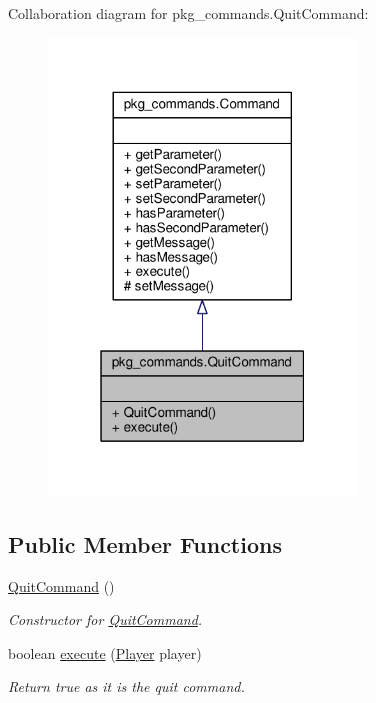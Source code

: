 Collaboration diagram for pkg\-\_\-commands.\-Quit\-Command\-:
\nopagebreak
\begin{figure}[H]
\begin{center}
\leavevmode
\includegraphics[width=232pt]{classpkg__commands_1_1QuitCommand__coll__graph}
\end{center}
\end{figure}
\subsection*{Public Member Functions}
\begin{DoxyCompactItemize}
\item 
\hyperlink{classpkg__commands_1_1QuitCommand_a92a35342caaa08998e70242e3e9997ae}{Quit\-Command} ()
\begin{DoxyCompactList}\small\item\em Constructor for \hyperlink{classpkg__commands_1_1QuitCommand}{Quit\-Command}. \end{DoxyCompactList}\item 
boolean \hyperlink{classpkg__commands_1_1QuitCommand_abdba7a2abe3df12571396448d6b9e8a6}{execute} (\hyperlink{classpkg__world_1_1Player}{Player} player)
\begin{DoxyCompactList}\small\item\em Return true as it is the quit command. \end{DoxyCompactList}\end{DoxyCompactItemize}
